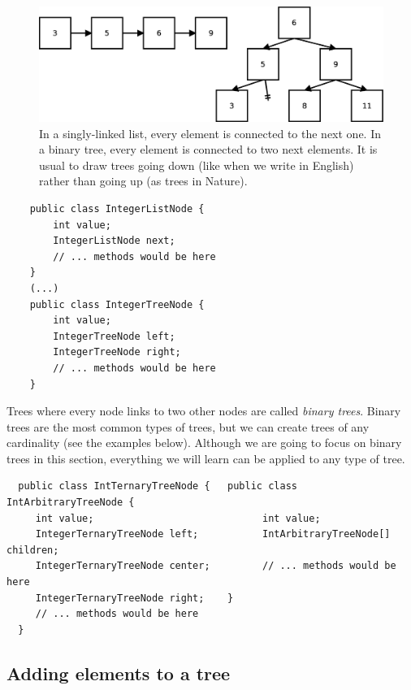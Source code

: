\begin{figure}[hbtp]
  \centering
  \includegraphics[width=\textwidth]{gfx/list-tree}
  \caption{In a singly-linked list, every element is connected to the
    next one. In a binary tree, every element is connected to two next
    elements. It is usual to draw trees going down (like when we
    write in English) rather than going up (as trees in Nature).}
  \label{fig:listree}
\end{figure}

\begin{verbatim}
    public class IntegerListNode {
        int value;
        IntegerListNode next;
        // ... methods would be here
    }
    (...)
    public class IntegerTreeNode {
        int value;
        IntegerTreeNode left;
        IntegerTreeNode right;
        // ... methods would be here
    }
\end{verbatim}

Trees where every node links to two other nodes are called
\emph{binary trees}. Binary trees are the most common types of
trees, but we can create trees of any cardinality (see the examples
below). Although we are going to focus on binary
trees in this section, everything we will learn can be applied to
any type of tree. 

{\small  %
  \begin{verbatim}
  public class IntTernaryTreeNode {   public class IntArbitraryTreeNode {
     int value;                             int value;
     IntegerTernaryTreeNode left;           IntArbitraryTreeNode[] children;
     IntegerTernaryTreeNode center;         // ... methods would be here
     IntegerTernaryTreeNode right;    }
     // ... methods would be here
  }
  \end{verbatim}
}

\subsection{Adding elements to a tree}
\label{sec:adding-elements-tree}

